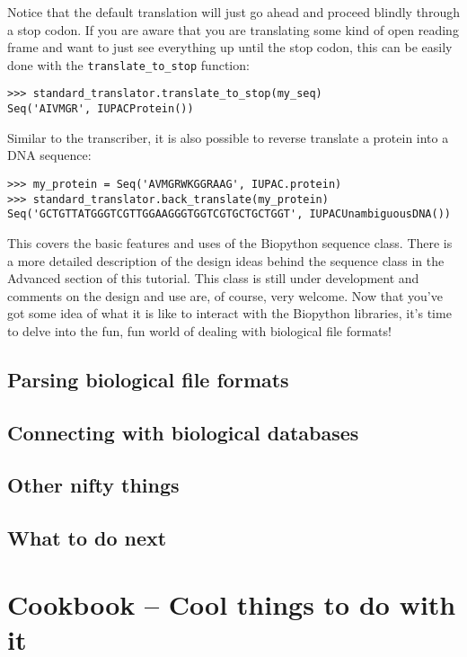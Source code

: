 \documentclass[dvips]{article}
\begin{document}
Notice that the default translation will just go ahead and proceed blindly through a stop codon. If you are aware that you are translating some kind of open reading frame and want to just see everything up until the stop codon, this can be easily done with the \verb|translate_to_stop| function:

\begin{verbatim}
>>> standard_translator.translate_to_stop(my_seq)
Seq('AIVMGR', IUPACProtein())
\end{verbatim}

Similar to the transcriber, it is also possible to reverse translate a protein into a DNA sequence:

\begin{verbatim}
>>> my_protein = Seq('AVMGRWKGGRAAG', IUPAC.protein)
>>> standard_translator.back_translate(my_protein)
Seq('GCTGTTATGGGTCGTTGGAAGGGTGGTCGTGCTGCTGGT', IUPACUnambiguousDNA())
\end{verbatim}

This covers the basic features and uses of the Biopython sequence class. There is a more detailed description of the design ideas behind the sequence class in the Advanced section of this tutorial. This class is still under development and comments on the design and use are, of course, very welcome. Now that you've got some idea of what it is like to interact with the Biopython libraries, it's time to delve into the fun, fun world of dealing with biological file formats!

\subsection{Parsing biological file formats}

\subsection{Connecting with biological databases}

\subsection{Other nifty things}

\subsection{What to do next}

\section{Cookbook -- Cool things to do with it}
\end{document}
